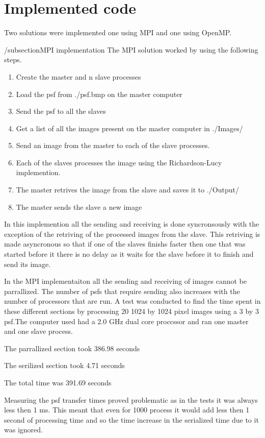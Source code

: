 \section{Implemented code}

Two solutions were implemented one using MPI and one using OpenMP. 

/subsection{MPI implementation}
The MPI solution worked by using the following steps.

\begin{enumerate}
	\item Create the master and n slave processes
	\item Load the psf from ./psf.bmp on the master computer
	\item Send the psf to all the slaves
	\item Get a list of all the images present on the master computer in ./Images/
	\item Send an image from the master to each of the slave processes.
	\item Each of the slaves processes the image using the Richardson-Lucy implemention.
	\item The master retrives the image from the slave and saves it to ./Output/
	\item The master sends the slave a new image
\end{enumerate}

In this implemention all the sending and receiving is done syncronsously with the exception of the retriving of the processed images from the slave. This retriving is made asyncronous so that if one of the slaves finishs faster then one that was started before it there is no delay as it waits for the slave before it to finish and send its image.

In the MPI implementaiton all the sending and receiving of images cannot be parrallized. The number of psfs that require sending also increases with the number of processors that are run. A test was conducted to find the time spent in these different sections by processing 20 1024 by 1024 pixel images  using a 3 by 3 psf.The computer used had a 2.0 GHz dual core proccssor and ran one master and one slave process.

The parrallized section took 386.98 seconds

The serilized section took 4.71 seconds

The total time was 391.69 seconds

Measuring the psf transfer times proved problematic as in the tests it was always less then 1 ms. This meant that even for 1000 process it would add less then 1 second of processing time and so the time increase in the serialized time due to it was ignored.


